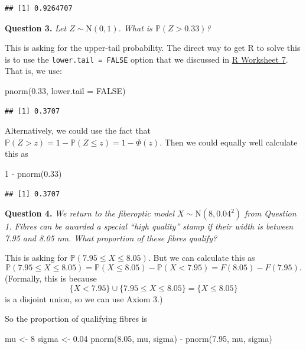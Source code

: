 \documentclass[
  a4paper,
]{book}
\newenvironment{Shaded}{\begin{snugshade}}{\end{snugshade}}
\newcommand{\AttributeTok}[1]{\textcolor[rgb]{0.77,0.63,0.00}{#1}}
\newcommand{\ConstantTok}[1]{\textcolor[rgb]{0.00,0.00,0.00}{#1}}
\newcommand{\DecValTok}[1]{\textcolor[rgb]{0.00,0.00,0.81}{#1}}
\newcommand{\FloatTok}[1]{\textcolor[rgb]{0.00,0.00,0.81}{#1}}
\newcommand{\FunctionTok}[1]{\textcolor[rgb]{0.00,0.00,0.00}{#1}}
\newcommand{\NormalTok}[1]{#1}
\newcommand{\OtherTok}[1]{\textcolor[rgb]{0.56,0.35,0.01}{#1}}
\newcommand{\SpecialCharTok}[1]{\textcolor[rgb]{0.00,0.00,0.00}{#1}}
\theoremstyle{definition}
\theoremstyle{definition}
\theoremstyle{definition}
\theoremstyle{definition}
\theoremstyle{remark}
\begin{document}
\begin{verbatim}
## [1] 0.9264707
\end{verbatim}

\textbf{Question 3.} \emph{Let \(Z \sim \mathrm{N}(0,1)\). What is \(\mathbb P(Z > 0.33)\)?}

This is asking for the upper-tail probability. The direct way to get R to solve this is to use the \texttt{lower.tail\ =\ FALSE} option that we discussed in \protect\hyperlink{r-work}{R Worksheet 7}. That is, we use:

\begin{Shaded}
\begin{Highlighting}[]
\FunctionTok{pnorm}\NormalTok{(}\FloatTok{0.33}\NormalTok{, }\AttributeTok{lower.tail =} \ConstantTok{FALSE}\NormalTok{)}
\end{Highlighting}
\end{Shaded}

\begin{verbatim}
## [1] 0.3707
\end{verbatim}

Alternatively, we could use the fact that \(\mathbb P(Z > z) = 1 - \mathbb P(Z \leq z) = 1 - \Phi(z)\). Then we could equally well calculate this as

\begin{Shaded}
\begin{Highlighting}[]
\DecValTok{1} \SpecialCharTok{{-}} \FunctionTok{pnorm}\NormalTok{(}\FloatTok{0.33}\NormalTok{)}
\end{Highlighting}
\end{Shaded}

\begin{verbatim}
## [1] 0.3707
\end{verbatim}

\textbf{Question 4.} \emph{We return to the fiberoptic model \(X \sim \mathrm{N}(8, 0.04^2)\) from Question 1. Fibres can be awarded a special ``high quality'' stamp if their width is between 7.95 and 8.05 nm. What proportion of these fibres qualify?}

This is asking for \(\mathbb P(7.95 \leq X \leq 8.05)\). But we can calculate this as
\[ \mathbb P(7.95 \leq X \leq 8.05) = \mathbb P(X \leq 8.05) - \mathbb P(X < 7.95) = F(8.05) - F(7.95) .\]
(Formally, this is because
\[ \{X < 7.95\} \cup \{7.95 \leq X \leq 8.05\} = \{X \leq 8.05\} \]
is a disjoint union, so we can use Axiom 3.)

So the proportion of qualifying fibres is

\begin{Shaded}
\begin{Highlighting}[]
\NormalTok{mu }\OtherTok{\textless{}{-}} \DecValTok{8}
\NormalTok{sigma }\OtherTok{\textless{}{-}} \FloatTok{0.04}
\FunctionTok{pnorm}\NormalTok{(}\FloatTok{8.05}\NormalTok{, mu, sigma) }\SpecialCharTok{{-}} \FunctionTok{pnorm}\NormalTok{(}\FloatTok{7.95}\NormalTok{, mu, sigma)}
\end{Highlighting}
\end{Shaded}
\end{document}
